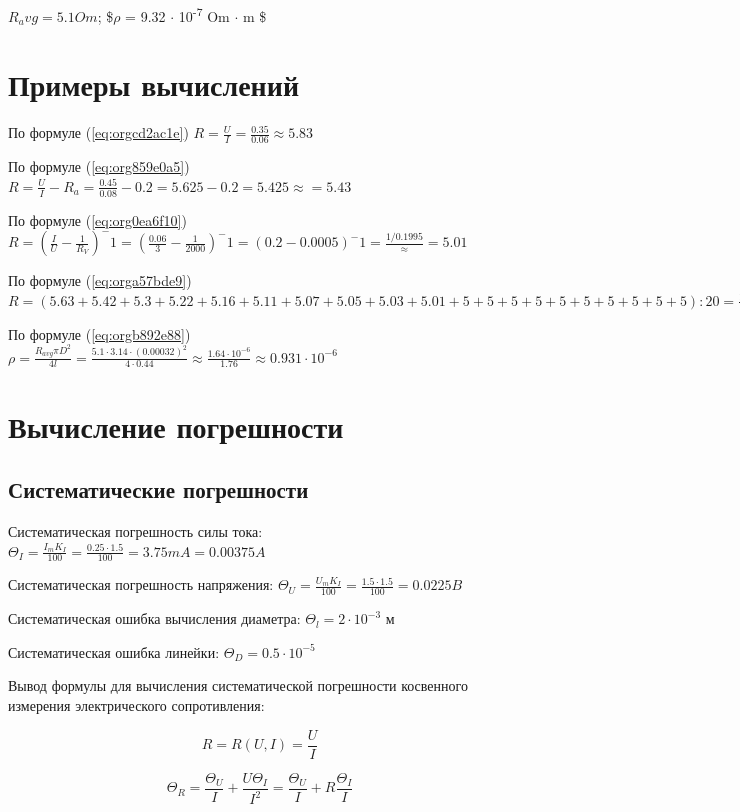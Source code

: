 \documentclass[14pt]{extarticle}
\begin{document}
\(R_avg = 5.1 Om\); \$\(\rho\) = 9.32 \(\cdot\) 10\textsuperscript{-7} Om \(\cdot\) m \$
\section{Примеры вычислений}
\label{sec:orge473d74}

По формуле (\ref{eq:orgcd2ac1e}) \(R = \frac{U}{I} = \frac{0.35}{0.06} \approx 5.83\)

По формуле (\ref{eq:org859e0a5}) \(R = \frac{U}{I} - R_a = \frac{0.45}{0.08} - 0.2 = 5.625 - 0.2 = 5.425 \approx = 5.43\)

По формуле (\ref{eq:org0ea6f10}) \(R = (\frac{I}{U} - \frac{1}{R_V})^-1 = (\frac{0.06}{3} - \frac{1}{2000})^-1  = (0.2 - 0.0005)^-1 = \frac{1/0.1995} \approx = 5.01\)

По формуле (\ref{eq:orga57bde9}) \(R = (5.63+5.42+5.3+5.22+5.16+5.11+5.07+5.05+5.03+5.01+5+5+5+5+5+5+5+5+5+5) : 20 = \frac{102}{20} = 5.1\)

По формуле (\ref{eq:orgb892e88}) \(\rho = \frac{R_{avg} \pi D^2}{4l} = \frac{5.1 \cdot 3.14 \cdot (0.00032)^2}{4 \cdot 0.44} \approx \frac{1.64 \cdot 10^{-6}}{1.76} \approx 0.931 \cdot 10^{-6}\)
\section{Вычисление погрешности}
\label{sec:orgca517e0}

\subsection{Систематические погрешности}
\label{sec:org4accb07}

Систематическая погрешность силы тока: \(\Theta_I = \frac{I_m K_I}{100} = \frac{0.25 \cdot 1.5}{100} = 3.75 mA = 0.00375 A\)

Систематическая погрешность напряжения: \(\Theta_U = \frac{U_m K_I}{100} = \frac{1.5 \cdot 1.5}{100} = 0.0225 B\)

Систематическая ошибка вычисления диаметра: \(\Theta_l = 2 \cdot 10^{-3}\) м

Систематическая ошибка линейки: \(\Theta_D = 0.5 \cdot 10^{-5}\) 

Вывод формулы для вычисления систематической погрешности косвенного измерения электрического
сопротивления:


$$ R = R(U, I) = \frac{U}{I} $$

$$ \Theta_R = \frac{\Theta_U}{I} + \frac{U \Theta_I}{I^2} = \frac{\Theta_U}{I} + R \frac{\Theta_I}{I} $$
\end{document}
